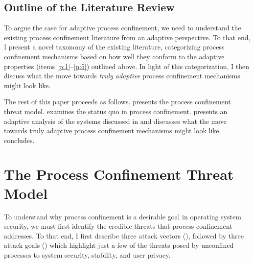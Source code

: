 \documentclass[dvipsnames, 12pt]{article}
\begin{document}
\subsection{Outline of the Literature Review}

To argue the case for adaptive process confinement, we need to understand the
existing process confinement literature from an adaptive perspective. To that
end, I present a novel taxonomy of the existing literature, categorizing process
confinement mechanisms based on how well they conform to the adaptive properties
(items \ref{p:1}--\ref{p:5}) outlined above.  In light of this categorization,
I then discuss what the move towards \textit{truly adaptive} process confinement
mechanisms might look like.

The rest of this paper proceeds as follows.  presents the
process confinement threat model.   examines the status quo
in process confinement.   presents an adaptive analysis of the
systems discussed in  and discusses what the move towards
truly adaptive process confinement mechanisms might look like.
 concludes.

\section{The Process Confinement Threat Model}
\label{sec:threat_model}

To understand why process confinement is a desirable goal in operating system
security, we must first identify the credible threats that process confinement
addresses. To that end, I first describe three attack vectors
(), followed by three attack goals ()
which highlight just a few of the threats posed by unconfined processes to
system security, stability, and user privacy.
\end{document}

